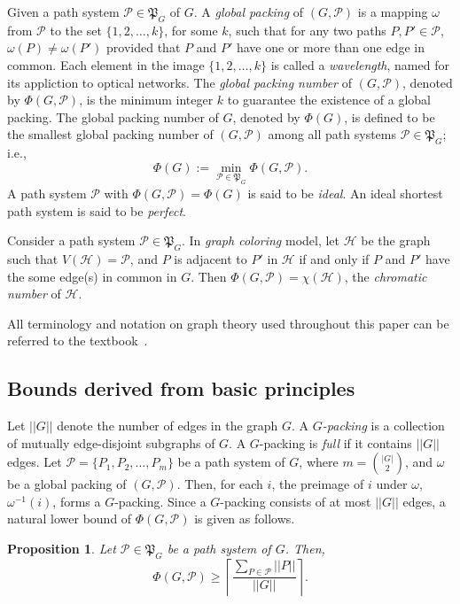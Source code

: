 \documentclass[journal,draftcls,onecolumn,12pt,twoside]{IEEEtran}
\newtheorem{proposition}[theorem]{\bf Proposition}
\begin{document}
Given a path system $\mathcal{P}\in\mathfrak{P}_G$ of $G$. 
A \emph{global packing} of $(G,\mathcal{P})$ is a mapping $\omega$ from $\mathcal{P}$ to the set $\{1,2,\ldots,k\}$, for some $k$, such that for any two paths $P,P'\in\mathcal{P}$, $\omega(P)\neq \omega(P')$ provided that $P$ and $P'$ have one or more than one edge in common.
Each element in the image $\{1,2,\ldots,k\}$ is called a \emph{wavelength}, named for its appliction to optical networks.
The \emph{global packing number} of $(G,\mathcal{P})$, denoted by $\Phi(G,\mathcal{P})$, is the minimum integer $k$ to guarantee the existence of a global packing.
The global packing number of $G$, denoted by $\Phi(G)$, is defined to be the smallest global packing number of $(G,\mathcal{P})$ among all path systems $\mathcal{P}\in\mathfrak{P}_G$; i.e., $$\Phi(G):=\min_{\mathcal{P}\in\mathfrak{P}_G}\Phi(G,\mathcal{P}).$$
A path system $\mathcal{P}$ with $\Phi(G,\mathcal{P})=\Phi(G)$ is said to be \emph{ideal}.
An ideal shortest path system is said to be {\em perfect}.

Consider a path system $\mathcal{P}\in\mathfrak{P}_G$.
In \emph{graph coloring} model, let $\mathcal{H}$ be the graph such that $V(\mathcal{H})=\mathcal{P}$, and $P$ is adjacent to $P'$ in $\mathcal{H}$ if and only if $P$ and $P'$ have the some edge(s) in common in $G$.
Then $\Phi(G,\mathcal{P})=\chi(\mathcal{H})$, the \emph{chromatic number} of $\mathcal{H}$.

All terminology and notation on graph theory used throughout this paper can be referred
to the textbook~\cite{West_01}.





\subsection{Bounds derived from basic principles} \label{sec:intro_bound}
Let $||G||$ denote the number of edges in the graph $G$.
A \emph{$G$-packing} is a collection of mutually edge-disjoint subgraphs of $G$.
A $G$-packing is \emph{full} if it contains $||G||$ edges.
Let $\mathcal{P}=\{P_1,P_2,\ldots,P_m\}$ be a path system of $G$, where $m={|G|\choose 2}$, and $\omega$ be a global packing of $(G,\mathcal{P})$.
Then, for each $i$, the preimage of $i$ under $\omega$, $\omega^{-1}(i)$, forms a $G$-packing.
Since a $G$-packing consists of at most $||G||$ edges, a natural lower bound of $\Phi(G,\mathcal{P})$ is given as follows.

\begin{proposition}\label{pro:lowerbound}
Let $\mathcal{P}\in\mathfrak{P}_G$ be a path system of $G$.
Then,
$$\Phi(G,\mathcal{P}) \geq \left\lceil \frac{\sum_{P\in\mathcal{P}} ||P||}{||G||} \right\rceil.$$
\end{proposition}
\end{document}
